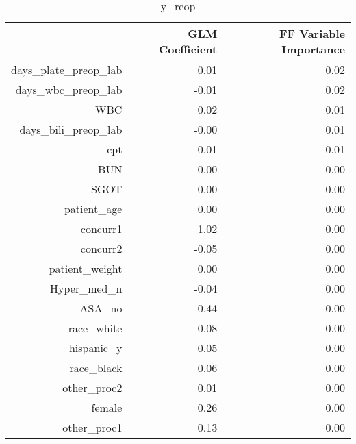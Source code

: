 \begin{table}[ht]
\centering
\begin{tabular}{rrr}
  \hline
 & GLM Coefficient & FF Variable Importance \\ 
  \hline
days\_plate\_preop\_lab & 0.01 & 0.02 \\ 
  days\_wbc\_preop\_lab & -0.01 & 0.02 \\ 
  WBC & 0.02 & 0.01 \\ 
  days\_bili\_preop\_lab & -0.00 & 0.01 \\ 
  cpt & 0.01 & 0.01 \\ 
  BUN & 0.00 & 0.00 \\ 
  SGOT & 0.00 & 0.00 \\ 
  patient\_age & 0.00 & 0.00 \\ 
  concurr1 & 1.02 & 0.00 \\ 
  concurr2 & -0.05 & 0.00 \\ 
  patient\_weight & 0.00 & 0.00 \\ 
  Hyper\_med\_n & -0.04 & 0.00 \\ 
  ASA\_no & -0.44 & 0.00 \\ 
  race\_white & 0.08 & 0.00 \\ 
  hispanic\_y & 0.05 & 0.00 \\ 
  race\_black & 0.06 & 0.00 \\ 
  other\_proc2 & 0.01 & 0.00 \\ 
  female & 0.26 & 0.00 \\ 
  other\_proc1 & 0.13 & 0.00 \\ 
   \hline
\end{tabular}
\caption{y_reop} 
\end{table}


